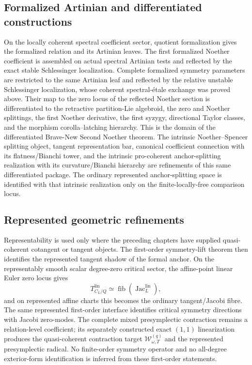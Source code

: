 \subsection{Formalized Artinian and differentiated constructions}
\label{subsec:symmetry-noether-formalized-artinian-and-differentiated-constructions}

On the locally coherent spectral coefficient sector, quotient formalization gives
the formalized relation and its Artinian leaves.  The first formalized Noether
coefficient is assembled on actual spectral Artinian tests and reflected by the
exact stable Schlessinger localization.  Complete formalized symmetry parameters
are restricted to the same Artinian leaf and reflected by the relative unstable
Schlessinger localization, whose coherent spectral-\'etale exchange was proved
above.  Their map to the zero locus of the reflected Noether
section is differentiated to the retractive partition-Lie algebroid, the zero and
Noether splittings, the first Noether derivative, the first syzygy, directional
Taylor classes, and the morphism corolla--latching hierarchy.  This is the domain of
the differentiated Brave-New Second Noether theorem.  The intrinsic
Noether--Spencer splitting object, tangent representation bar, canonical coefficient
connection with its flatness/Bianchi tower, and the intrinsic pro-coherent
anchor-splitting realization with its curvature/Bianchi hierarchy are refinements of
this same differentiated package.  The ordinary represented anchor-splitting space
is identified with that intrinsic realization only on the finite-locally-free
comparison locus.

\subsection{Represented geometric refinements}
\label{subsec:symmetry-noether-represented-geometric-refinements}

Representability is used only where the preceding chapters have supplied
quasi-coherent cotangent or tangent objects.  The first-order symmetry-lift theorem
then identifies the represented tangent shadow of the formal anchor.  On the
representably smooth scalar degree-zero critical sector, the affine-point linear
Euler zero locus gives
\[
T_{C_L/Q}^{\mathrm{lin}}
\simeq
\operatorname{fib}(\operatorname{Jac}^{\mathrm{lin}}_L),
\]
and on represented affine charts this becomes the ordinary tangent/Jacobi fibre.
The same represented first-order interface identifies critical symmetry directions
with Jacobi zero-modes.  The complete mixed presymplectic contraction remains a
relation-level coefficient; its separately constructed exact $(1,1)$
linearization produces the quasi-coherent contraction target
$\mathcal W_{\omega,T}^{(q)}$ and the represented presymplectic radical.  No
finite-order symmetry operator and no all-degree exterior-form identification is
inferred from these first-order statements.

